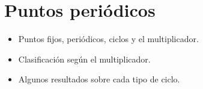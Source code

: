 \chapter{Puntos periódicos}

\begin{itemize}
    \item Puntos fijos, periódicos, ciclos y el multiplicador.
    \item Clasificación según el multiplicador.
    \item Algunos resultados sobre cada tipo de ciclo.
\end{itemize}